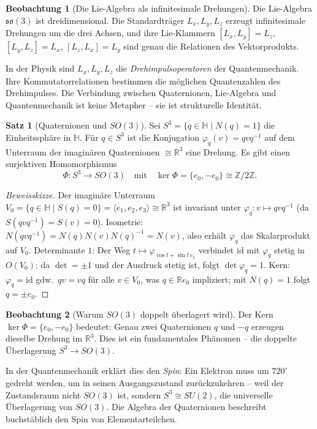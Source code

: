 ﻿\documentclass[a4paper,12pt]{report}
\theoremstyle{definition}
\newtheorem{satz}{Satz}
\newtheorem{beobachtung}{Beobachtung}
\begin{document}
\begin{beobachtung}[Die Lie-Algebra als infinitesimale Drehungen]
    Die Lie-Algebra $\mathfrak{so}(3)$ ist dreidimensional. Die Standardträger
    $L_x, L_y, L_z$ erzeugt infinitesimale Drehungen um die drei Achsen,
    und ihre Lie-Klammern $[L_x, L_y] = L_z$, $[L_y, L_z] = L_x$,
    $[L_z, L_x] = L_y$ sind genau die Relationen des Vektorprodukts.

    In der Physik sind $L_x, L_y, L_z$ die \emph{Drehimpulsoperatoren}
    der Quantenmechanik. Ihre Kommutatorrelationen bestimmen die möglichen
    Quantenzahlen des Drehimpulses. Die Verbindung zwischen Quaternionen,
    Lie-Algebra und Quantenmechanik ist keine Metapher -- sie ist
    strukturelle Identität.
\end{beobachtung}

\begin{satz}[Quaternionen und \texorpdfstring{$SO(3)$}{SO(3)}]
    Sei $S^3 = \{q \in \mathbb{H} \mid N(q) = 1\}$ die Einheitssphäre
    in $\mathbb{H}$. Für $q \in S^3$ ist die Konjugation
    $\varphi_q(v) = q v q^{-1}$ auf dem Unterraum der imaginären
    Quaternionen $\cong \mathbb{R}^3$ eine Drehung. Es gibt einen
    surjektiven Homomorphismus
    \[
        \Phi : S^3 \longrightarrow SO(3) \quad \text{mit} \quad
        \ker \Phi = \{e_0, -e_0\} \cong \mathbb{Z}/2\mathbb{Z}.
    \]
\end{satz}
\begin{proof}[Beweisskizze]
    Der imaginäre Unterraum $V_0 = \{q \in \mathbb{H} \mid S(q) = 0\}
    = \langle e_1, e_2, e_3 \rangle \cong \mathbb{R}^3$ ist invariant unter
    $\varphi_q : v \mapsto qvq^{-1}$ (da $S(qvq^{-1}) = S(v) = 0$).
    Isometrie: $N(qvq^{-1}) = N(q)N(v)N(q)^{-1} = N(v)$, also erhält
    $\varphi_q$ das Skalarprodukt auf $V_0$. Determinante $1$: Der Weg
    $t \mapsto \varphi_{\cos t + \sin t \, e_1}$ verbindet $\mathrm{id}$ mit
    $\varphi_q$ stetig in $O(V_0)$; da $\det = \pm 1$ und der Ausdruck
    stetig ist, folgt $\det \varphi_q = 1$.
    Kern: $\varphi_q = \mathrm{id}$ gdw.\ $qv = vq$ für alle $v \in V_0$,
    was $q \in \mathbb{R} e_0$ impliziert; mit $N(q) = 1$ folgt $q = \pm e_0$.
\end{proof}


\begin{beobachtung}[Warum \texorpdfstring{$SO(3)$}{SO(3)} doppelt überlagert wird]
    Der Kern $\ker \Phi = \{e_0, -e_0\}$ bedeutet: Genau zwei Quaternionen
    $q$ und $-q$ erzeugen dieselbe Drehung im $\mathbb{R}^3$. Dies ist
    ein fundamentales Phänomen -- die doppelte Überlagerung $S^3 \to SO(3)$.

    In der Quantenmechanik erklärt dies den \emph{Spin}: Ein Elektron
    muss um $720^\circ$ gedreht werden, um in seinen Ausgangszustand
    zurückzukehren -- weil der Zustandsraum nicht $SO(3)$ ist, sondern
    $S^3 \cong SU(2)$, die universelle Überlagerung von $SO(3)$.
    Die Algebra der Quaternionen beschreibt buchstäblich den Spin
    von Elementarteilchen.
\end{beobachtung}
\end{document}
